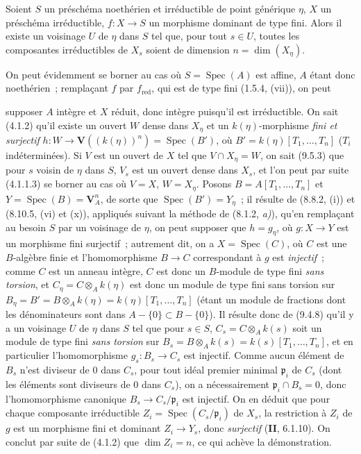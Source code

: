 \begin{corollary}[9.5.6]
\label{IV.9.5.6-fr}
Soient $S$ un préschéma noethérien et irréductible de point générique $\eta$,
$X$ un préschéma irréductible, $f:X\to S$ un morphisme dominant de type fini.
Alors il existe un voisinage $U$ de $\eta$ dans $S$ tel que, pour tout
$s\in U$, toutes les composantes irréductibles de $X_s$ soient de dimension
$n=\dim(X_\eta)$.
\end{corollary}

On peut évidemment se borner au cas où $S=\operatorname{Spec}(A)$ est affine,
$A$ étant donc noethérien~; remplaçant $f$ par $f_{\mathrm{red}}$, qui est de
type fini (1.5.4, (vii)), on peut


supposer $A$ intègre et $X$ réduit, donc intègre puisqu'il est irréductible. On
sait (4.1.2) qu'il existe un ouvert $W$ dense dans $X_\eta$ et un
$k(\eta)$-morphisme \emph{fini et surjectif}
$h:W\to\mathbf V((k(\eta))^n)=\operatorname{Spec}(B')$, où
$B'=k(\eta)[T_1,\ldots,T_n]$ ($T_i$ indéterminées). Si $V$ est un ouvert de
$X$ tel que $V\cap X_\eta=W$, on sait (9.5.3) que pour $s$ voisin de $\eta$
dans $S$, $V_s$ est un ouvert dense dans $X_s$, et l'on peut par suite (4.1.1.3)
se borner au cas où $V=X$, $W=X_\eta$. Posons
$B=A[T_1,\ldots,T_n]$ et $Y=\operatorname{Spec}(B)=\mathbf V_A^n$, de sorte
que $\operatorname{Spec}(B')=Y_\eta$~; il résulte de (8.8.2, (i)) et
(8.10.5, (vi) et (x)), appliqués suivant la méthode de (8.1.2, \emph{a)}),
qu'en remplaçant au besoin $S$ par un voisinage de $\eta$, on peut supposer que
$h=g_\eta$, où $g:X\to Y$ est un morphisme fini surjectif~; autrement dit, on
a $X=\operatorname{Spec}(C)$, où $C$ est une $B$-algèbre finie et
l'homomorphisme $B\to C$ correspondant à $g$ est \emph{injectif}~; comme $C$
est un anneau intègre, $C$ est donc un $B$-module de type fini \emph{sans
torsion}, et $C_\eta=C\otimes_A k(\eta)$ est donc un module de type fini sans
torsion sur $B_\eta=B'=B\otimes_A k(\eta)=k(\eta)[T_1,\ldots,T_n]$ (étant un
module de fractions dont les dénominateurs sont dans
$A-\{0\}\subset B-\{0\}$). Il résulte donc de (9.4.8) qu'il y a un voisinage
$U$ de $\eta$ dans $S$ tel que pour $s\in S$,
$C_s=C\otimes_A k(s)$ soit un module de type fini \emph{sans torsion} sur
$B_s=B\otimes_A k(s)=k(s)[T_1,\ldots,T_n]$, et en particulier l'homomorphisme
$g_s:B_s\to C_s$ est injectif. Comme aucun élément de $B_s$ n'est diviseur de
0 dans $C_s$, pour tout idéal premier minimal $\mathfrak p_i$ de $C_s$ (dont
les éléments sont diviseurs de 0 dans $C_s$), on a nécessairement
$\mathfrak p_i\cap B_s=0$, donc l'homomorphisme canonique
$B_s\to C_s/\mathfrak p_i$ est injectif. On en déduit que pour chaque
composante irréductible $Z_i=\operatorname{Spec}(C_s/\mathfrak p_i)$ de $X_s$,
la restriction à $Z_i$ de $g$ est un morphisme fini et dominant $Z_i\to Y_s$,
donc \emph{surjectif} (\textbf{II}, 6.1.10). On conclut par suite de (4.1.2)
que $\dim Z_i=n$, ce qui achève la démonstration.

